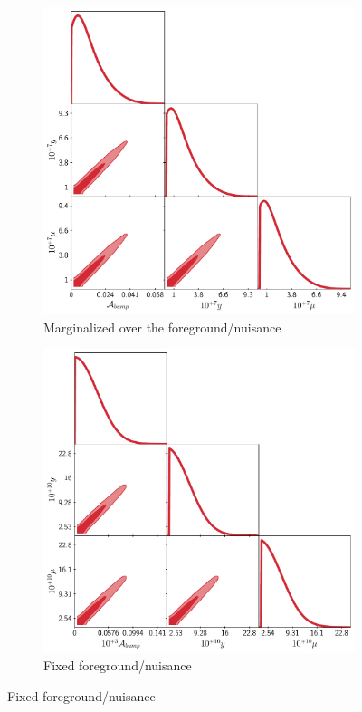 \begin{figure}[ht!]
    \centering
    \begin{subfigure}{0.49\textwidth}
        \centering
        \includegraphics[width=1\textwidth]{Constraints/Lognormal.pdf}
        \caption{Marginalized over the foreground/nuisance}
        \label{fig:LN}        
    \end{subfigure}
    \hfill
    \begin{subfigure}{0.49\textwidth}
        \centering
        \includegraphics[width=1\textwidth]{Constraints/LN_NN.pdf}
        \caption{Fixed foreground/nuisance}
        \label{fig:LN_NN}        
    \end{subfigure}


\end{figure}
